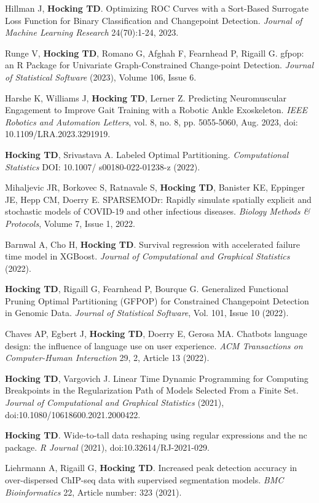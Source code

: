 \documentclass[margin,line]{res}
\begin{document}
\begin{resume}
Hillman J, {\bf Hocking TD}. Optimizing ROC Curves with a Sort-Based
Surrogate Loss Function for Binary Classification and Changepoint
Detection. {\it Journal of Machine Learning Research} 24(70):1-24, 2023.

Runge V, {\bf Hocking TD}, Romano G, Afghah F, Fearnhead P, Rigaill
G. gfpop: an R Package for Univariate Graph-Constrained Change-point
Detection. {\it Journal of Statistical Software} (2023), Volume 106,
Issue 6.

Harshe K, Williams J, {\bf Hocking TD}, Lerner Z. Predicting Neuromuscular
Engagement to Improve Gait Training with a Robotic Ankle
Exoskeleton. {\it IEEE Robotics and Automation Letters}, vol. 8,
no. 8, pp. 5055-5060, Aug. 2023, doi: 10.1109/LRA.2023.3291919.

{\bf Hocking TD}, Srivastava A. Labeled Optimal Partitioning. {\it
  Computational Statistics} DOI: 10.1007/ s00180-022-01238-z (2022).

Mihaljevic JR, Borkovec S, Ratnavale S, \textbf{Hocking TD}, Banister
KE, Eppinger JE, Hepp CM, Doerry E. SPARSEMODr: Rapidly simulate
spatially explicit and stochastic models of COVID-19 and other
infectious diseases. {\it Biology Methods \& Protocols}, Volume 7,
Issue 1, 2022.

Barnwal A, Cho H, {\bf Hocking TD}. Survival regression with
accelerated failure time model in XGBoost. {\it Journal of
  Computational and Graphical Statistics} (2022).

{\bf Hocking TD}, Rigaill G, Fearnhead P, Bourque G. Generalized
Functional Pruning Optimal Partitioning (GFPOP) for Constrained
Changepoint Detection in Genomic Data. {\it Journal of Statistical
  Software}, Vol. 101, Issue 10 (2022).

Chaves AP, Egbert J, {\bf Hocking TD}, Doerry E, Gerosa MA. Chatbots
language design: the influence of language use on user
experience. {\it ACM Transactions on Computer-Human Interaction} 29,
2, Article 13 (2022).

{\bf Hocking TD}, Vargovich J. Linear Time Dynamic Programming for
Computing Breakpoints in the Regularization Path of Models Selected
From a Finite Set. {\it Journal of Computational and Graphical
  Statistics} (2021), doi:10.1080/10618600.2021.2000422.

{\bf Hocking TD}. Wide-to-tall data reshaping using regular
expressions and the nc package. {\it R Journal} (2021),
doi:10.32614/RJ-2021-029.

Liehrmann A, Rigaill G, {\bf Hocking TD}. Increased peak detection
accuracy in over-dispersed ChIP-seq data with supervised segmentation
models. {\it BMC Bioinformatics} 22, Article number: 323 (2021).


\end{resume}
\end{document}
